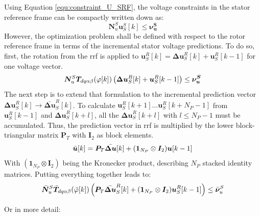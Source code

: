 Using Equation \eqref{equ:constraint_U_SRF}, the voltage constraints in the stator reference frame can be compactly written down as:
\[
\bm{N}_u^S{\bm{u}^S_S[k]} \le \bm{\nu^S_u}
\]
However, the optimization problem shall be defined with respect to the rotor reference frame in terms of the incremental stator voltage predictions. To do so, first, the rotation from the \acrshort{rrf} is applied to  $\bm{u}_S^R[k] = \bm{\Delta u}_S^R[k] + \bm{u}_S^R[k-1]$ for one  voltage vector.
\[
\bm{N}_u^S \bm{T}_{ d q \alpha \beta}(\varphi [k])\left(\bm{\Delta u}_S^R[k] + \bm{u}_S^R[k-1] \right)\le \bm{\nu^S_u}
\]
The next step is to extend that formulation to the incremental prediction vector ${\bm{\Delta u}}_S^R[k] \rightarrow \bar{\bm{\Delta u}}_S^R[k]$. To calculate ${\bm{u}}_S^R[k+1] \dots {\bm{u}}_S^R[k+N_P-1]$ from ${\bm{u}}_S^R[k-1]$ and ${\bm{\Delta u}}_S^R[k+l]$, all the ${\bm{\Delta u}}_S^R[k+l]$ with $l \leq N_P-1$ must be accumulated. Thus, the prediction vector in \acrshort{rrf} is multiplied by the lower block-triangular matrix $\bm{P}_T$ with $\mathbf{I}_2$ as block elements.
\[
\Bar{\bm{u}}[k] = \bm{P}_T \Bar{\bm{\Delta u}}[k] +  (\bm{1}_{N_P} \otimes \bm{I}_2) \bm{u}[k-1]
\]
With $ (\bm{1}_{N_P} \otimes \bm{I}_2)$ being the Kronecker product, describing $N_P$ stacked identity matrices. Putting everything together leads to:
\begin{equation}
	\Bar{\bm{N}}_u^S \Bar{\bm{T}}_{ d q \alpha \beta}(\Bar{\varphi} [k])\left(\bm{P}_T \bar{\bm{\Delta u}}_S^R[k] +  (\bm{1}_{N_P} \otimes \bm{I}_2)\bm{u}_S^R[k-1] \right)\le \Bar{\bm{\nu}}^S_u 
	\label{equ:u_constr_SRF}
\end{equation}

Or in more detail:

